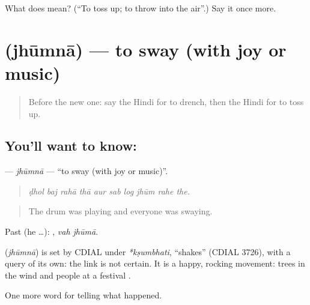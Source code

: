 \begin{tcolorbox}[breakable,colback=teal!4,colframe=teal!35!black,title={Before you move on}]
What does  mean? (\textquotedblleft{}To toss up; to throw into the air\textquotedblright{}.) Say it once more.
\end{tcolorbox}
\section[\texorpdfstring{\hi{झूमना} (jhūmnā)}{झूमना (jhūmnā)}]{ (jhūmnā) — to sway (with joy or music)}

\label{lesson:HI-C329-jhumna}



\begin{quote}
Before the new one: say the Hindi for to drench, then the Hindi for to toss up.
\end{quote}

\subsection*{You'll want to know: }
\textbf{} — \emph{jhūmnā} — \textquotedblleft{}to sway (with joy or music)\textquotedblright{}.

\begin{quote}
         
\end{quote}

\begin{quote}
\emph{ḍhol baj rahā thā aur sab log jhūm rahe the.}
\end{quote}

\begin{quote}
The drum was playing and everyone was swaying.
\end{quote}

Past (he …):  , \emph{vah jhūmā}.

\begin{cousinweb}
\textbf{} (\emph{jhūmnā}) is set by CDIAL under \emph{*kṣumbhati}, \textquotedblleft{}shakes\textquotedblright{} (CDIAL 3726), with a query of its own: the link is not certain. It is a happy, rocking movement: trees in the wind and people at a festival \textbf{ }.
\end{cousinweb}

\begin{grammarlens}[title={What you've built}]
One more word for telling what happened.
\end{grammarlens}

